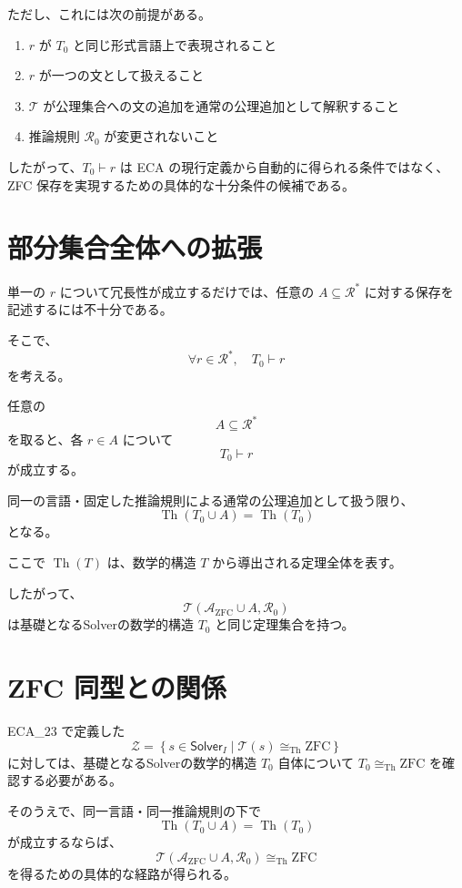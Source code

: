 \documentclass[a4paper,11pt]{article}
\newcommand{\Solver}{\mathsf{Solver}}
\begin{document}
ただし、これには次の前提がある。

\begin{enumerate}
\item $r$ が $T_0$ と同じ形式言語上で表現されること
\item $r$ が一つの文として扱えること
\item $\mathcal{T}$ が公理集合への文の追加を通常の公理追加として解釈すること
\item 推論規則 $\mathcal{R}_0$ が変更されないこと
\end{enumerate}

したがって、$T_0\vdash r$ は ECA の現行定義から自動的に得られる条件ではなく、ZFC 保存を実現するための具体的な十分条件の候補である。

\section{部分集合全体への拡張}

単一の $r$ について冗長性が成立するだけでは、任意の $A\subseteq\mathcal{R}^*$ に対する保存を記述するには不十分である。

そこで、
\[
\boxed{\forall r\in\mathcal{R}^*,\quad T_0\vdash r}
\]
を考える。

任意の
\[
A\subseteq\mathcal{R}^*
\]
を取ると、各 $r\in A$ について
\[
T_0\vdash r
\]
が成立する。

同一の言語・固定した推論規則による通常の公理追加として扱う限り、
\[
\operatorname{Th}(T_0\cup A)
=
\operatorname{Th}(T_0)
\]
となる。

ここで $\operatorname{Th}(T)$ は、数学的構造 $T$ から導出される定理全体を表す。

したがって、
\[
\mathcal{T}(\mathcal{A}_{\mathrm{ZFC}}\cup A,\mathcal{R}_0)
\]
は基礎となるSolverの数学的構造 $T_0$ と同じ定理集合を持つ。

\section{ZFC 同型との関係}
ECA_23 で定義した
\[
\mathcal{Z}=
\left\{
s\in\Solver_I
\mid
\mathcal{T}(s)\cong_{\mathrm{Th}}\mathrm{ZFC}
\right\}
\]
に対しては、基礎となるSolverの数学的構造 $T_0$ 自体について $T_0\cong_{\mathrm{Th}}\mathrm{ZFC}$ を確認する必要がある。

そのうえで、同一言語・同一推論規則の下で
\[
\operatorname{Th}(T_0\cup A) = \operatorname{Th}(T_0)
\]
が成立するならば、
\[
\mathcal{T}(\mathcal{A}_{\mathrm{ZFC}}\cup A,\mathcal{R}_0) \cong_{\mathrm{Th}} \mathrm{ZFC}
\]
を得るための具体的な経路が得られる。
\end{document}
